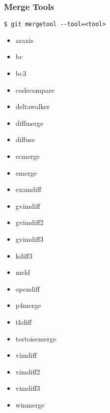 \begin{frame}[fragile]
    \frametitle{Merge Tools}
    \begin{verbatim}
$ git mergetool --tool=<tool>
    \end{verbatim}
    \begin{multicols}{3}
    \begin{itemize}
        \item araxis
        \item bc
        \item bc3
        \item codecompare
        \item deltawalker
        \item diffmerge
        \item diffuse
        \item ecmerge
        \item emerge
        \item examdiff
        \item gvimdiff
        \item gvimdiff2
        \item gvimdiff3
        \item kdiff3
        \item meld
        \item opendiff
        \item p4merge
        \item tkdiff
        \item tortoisemerge
        \item vimdiff
        \item vimdiff2
        \item vimdiff3
        \item winmerge
    \end{itemize}
    \end{multicols}
\end{frame}

